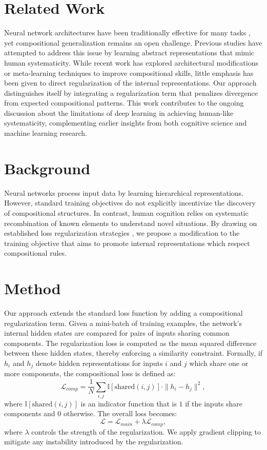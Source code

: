 \documentclass{article} %
\theoremstyle{plain}
\theoremstyle{definition}
\theoremstyle{remark}
\begin{document}
\section{Related Work}
Neural network architectures have been traditionally effective for many tasks \citep{goodfellow2016deep}, yet compositional generalization remains an open challenge. Previous studies have attempted to address this issue by learning abstract representations that mimic human systematicity. While recent work has explored architectural modifications or meta-learning techniques to improve compositional skills, little emphasis has been given to direct regularization of the internal representations. Our approach distinguishes itself by integrating a regularization term that penalizes divergence from expected compositional patterns. This work contributes to the ongoing discussion about the limitations of deep learning in achieving human-like systematicity, complementing earlier insights from both cognitive science and machine learning research.

\section{Background}
Neural networks process input data by learning hierarchical representations. However, standard training objectives do not explicitly incentivize the discovery of compositional structures. In contrast, human cognition relies on systematic recombination of known elements to understand novel situations. By drawing on established loss regularization strategies \citep{goodfellow2016deep}, we propose a modification to the training objective that aims to promote internal representations which respect compositional rules.

\section{Method}
Our approach extends the standard loss function by adding a compositional regularization term. Given a mini-batch of training examples, the network’s internal hidden states are compared for pairs of inputs sharing common components. The regularization loss is computed as the mean squared difference between these hidden states, thereby enforcing a similarity constraint. Formally, if $h_i$ and $h_j$ denote hidden representations for inputs $i$ and $j$ which share one or more components, the compositional loss is defined as:
\[
\mathcal{L}_{comp} = \frac{1}{N}\sum_{i,j} \mathbb{I}[\text{shared}(i,j)] \cdot \|h_i - h_j\|^2,
\]
where $\mathbb{I}[\text{shared}(i,j)]$ is an indicator function that is $1$ if the inputs share components and $0$ otherwise. The overall loss becomes:
\[
\mathcal{L} = \mathcal{L}_{main} + \lambda \mathcal{L}_{comp},
\]
where $\lambda$ controls the strength of the regularization. We apply gradient clipping to mitigate any instability introduced by the regularization.
\end{document}

